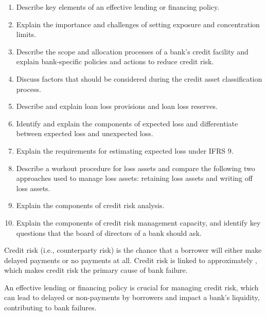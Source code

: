 
\begin{crkeybox}
\begin{enumerate}[label=\textbf{\alph*.},leftmargin=2em]
\item Describe key elements of an effective lending or financing policy.
\item Explain the importance and challenges of setting exposure and concentration limits.
\item Describe the scope and allocation processes of a bank's credit facility and explain bank-specific policies and actions to reduce credit risk.
\item Discuss factors that should be considered during the credit asset classification process.
\item Describe and explain loan loss provisions and loan loss reserves.
\item Identify and explain the components of expected loss and differentiate between expected loss and unexpected loss.
\item Explain the requirements for estimating expected loss under IFRS 9.
\item Describe a workout procedure for loss assets and compare the following two approaches used to manage loss assets: retaining loss assets and writing off loss assets.
\item Explain the components of credit risk analysis.
\item Explain the components of credit risk management capacity, and identify key questions that the board of directors of a bank should ask.
\end{enumerate}
\end{crkeybox}


\begin{crdefbox}
Credit risk (i.e., counterparty risk) is the chance that a borrower will either
make delayed payments or no payments at all. Credit risk is linked to
approximately , which makes credit risk the
primary cause of bank failure.
\end{crdefbox}

An effective lending or financing policy is crucial for managing credit risk,
which can lead to delayed or non-payments by borrowers and impact a bank's
liquidity, contributing to bank failures.

